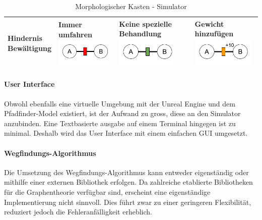\documentclass[../main.tex]{subfiles}
\begin{document}
\begin{table}[htbp!]
\begin{tabularx}{\textwidth}{| X | Y | Y | Y |}
        \textbf{Hindernis \newline Bewältigung}   &     
        Immer umfahren \newline
        \includegraphics[width=3cm]{img/simulation/morphologischer-kasten/hindernis-umfahren.png}
        &
        Keine spezielle Behandlung \newline
        \includegraphics[width=3cm]{img/simulation/morphologischer-kasten/hindernis-ignoriert.png}
        &
        Gewicht hinzufügen\newline
        \includegraphics[width=3cm]{img/simulation/morphologischer-kasten/hindernis-gewicht.png}
        \\ \hline
    \end{tabularx}
    \label{tab:sim_Morphologischer_Kasten}
    \caption{Morphologischer Kasten - Simulator}
\end{table}

\paragraph{User Interface}

Obwohl ebenfalls eine virtuelle Umgebung mit der Unreal Engine und dem Pfadfinder-Model existiert, ist der Aufwand zu gross, diese an den Simulator anzubinden. Eine Textbasierte ausgabe auf einem Terminal hingegen ist zu minimal. Deshalb wird das User Interface mit einem einfachen GUI umgesetzt. 

\paragraph{Wegfindungs-Algorithmus}

Die Umsetzung des Wegfindungs-Algorithmus kann entweder eigenständig oder mithilfe einer externen Bibliothek erfolgen. Da zahlreiche etablierte Bibliotheken für die Graphentheorie verfügbar sind, erscheint eine eigenständige Implementierung nicht sinnvoll. Dies führt zwar zu einer geringeren Flexibilität, reduziert jedoch die Fehleranfälligkeit erheblich.
\end{document}
